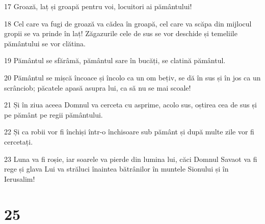 \par 17 Groază, laț și groapă pentru voi, locuitori ai pământului!
\par 18 Cel care va fugi de groază va cădea în groapă, cel care va scăpa din mijlocul gropii se va prinde în laț! Zăgazurile cele de sus se vor deschide și temeliile pământului se vor clătina.
\par 19 Pământul se sfărâmă, pământul sare în bucăți, se clatină pământul.
\par 20 Pământul se mișcă încoace și încolo ca un om bețiv, se dă în sus și în jos ca un scrânciob; păcatele apasă asupra lui, ca să nu se mai scoale!
\par 21 Și în ziua aceea Domnul va cerceta cu asprime, acolo sus, oștirea cea de sus și pe pământ pe regii pământului.
\par 22 Și ca robii vor fi închiși într-o închisoare sub pământ și după multe zile vor fi cercetați.
\par 23 Luna va fi roșie, iar soarele va pierde din lumina lui, căci Domnul Savaot va fi rege și glava Lui va străluci înaintea bătrânilor în muntele Sionului și în Ierusalim!

\chapter{25}

